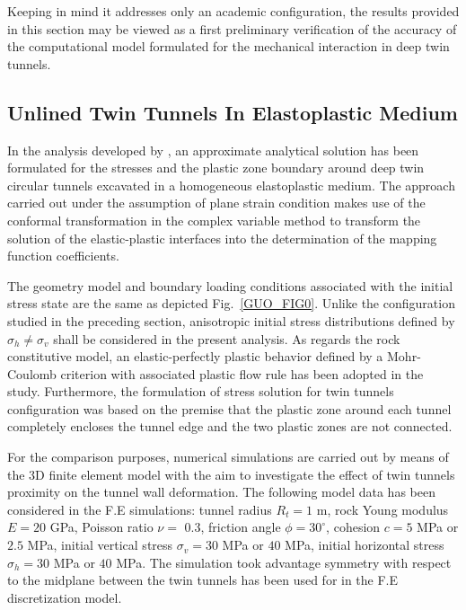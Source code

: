 \documentclass[Journal,letterpaper, NoLists,SectionNumbers]{ascelike-new}
\begin{document}
Keeping in mind it addresses only an academic configuration, the results provided in this section may be viewed as a first preliminary verification of the accuracy of the computational model formulated for the mechanical interaction in deep twin tunnels.



\subsection{Unlined Twin Tunnels In Elastoplastic Medium}\label{}

In the analysis developed by , an approximate analytical solution has been formulated for the stresses and the plastic zone boundary around deep twin circular tunnels excavated in a homogeneous elastoplastic medium. The approach carried out under the assumption of plane strain condition makes use of the conformal transformation in the complex variable method to transform the solution of the elastic-plastic interfaces into the determination of the mapping function coefficients.

The geometry model and boundary loading conditions associated with the initial stress state are the same as depicted Fig.~\ref{GUO_FIG0}. Unlike the configuration studied in the preceding section, anisotropic initial stress distributions defined by $\sigma_h \neq \sigma_v$ shall be considered in the present analysis. As regards the rock constitutive model, an elastic-perfectly plastic behavior defined by a Mohr-Coulomb criterion with associated plastic flow rule has been adopted in the study.  Furthermore, the formulation of stress solution for twin tunnels configuration was based on the premise that the plastic zone around each tunnel completely encloses the tunnel edge and the two plastic zones are not connected.

For the comparison purposes, numerical simulations are carried out by means of the 3D finite element model with the aim to investigate the effect of twin tunnels proximity on the tunnel wall deformation. The following model data has been considered in the F.E simulations: tunnel radius $R_t = 1$ m, rock Young modulus $E = 20$ GPa, Poisson ratio $\nu =$ 0.3, friction angle $\phi = 30^\circ$, cohesion $c = 5$ MPa or $2.5$ MPa, initial vertical stress $\sigma_v =30$ MPa or $40$ MPa, initial horizontal stress $\sigma_h = 30$ MPa or $40$ MPa. The simulation took advantage symmetry with respect to the midplane between the twin tunnels has been used for in the F.E discretization model.
\end{document}
